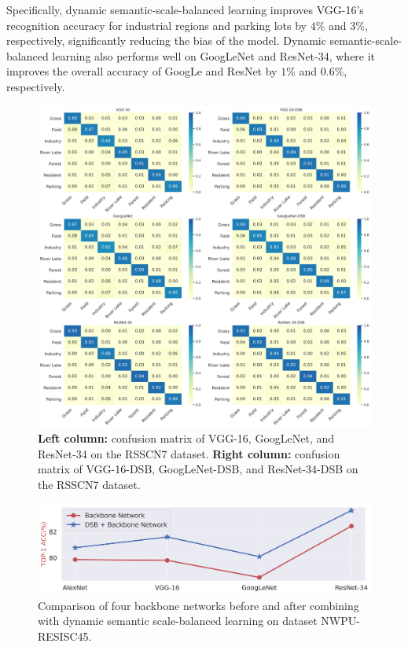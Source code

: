 \documentclass[10pt]{article} %
\begin{document}
Specifically, dynamic semantic-scale-balanced learning improves VGG-16's recognition accuracy for industrial regions and parking lots by $4$\% and $3$\%, respectively, significantly reducing the bias of the model. Dynamic semantic-scale-balanced learning also performs well on GoogLeNet and ResNet-34, where it improves the overall accuracy of GoogLe and ResNet by $1$\% and $0.6$\%, respectively.

\begin{figure}[t]
\begin{center}
\includegraphics[width=1\columnwidth]{nfig32}
\vskip -0.1in
\caption{\textbf{Left column:} confusion matrix of VGG-16, GoogLeNet, and ResNet-34 on the RSSCN7 dataset. \textbf{Right column:} confusion matrix of VGG-16-DSB, GoogLeNet-DSB, and ResNet-34-DSB on the RSSCN7 dataset.}
\label{fig32}
\end{center}
\vskip -0.17in
\end{figure}

\begin{figure}[t]
\begin{center}
\includegraphics[width=1\columnwidth]{fig33}
\vskip -0.1in
\caption{Comparison of four backbone networks before and after combining with dynamic semantic scale-balanced learning on dataset NWPU-RESISC45.}
\label{fig33}
\end{center}
\end{figure}
\end{document}

